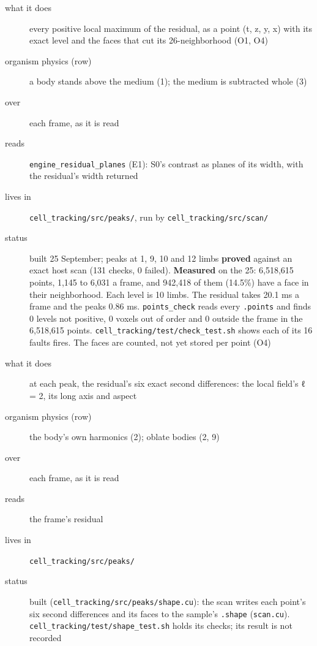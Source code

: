 \begin{description}
\item[{what it does}] every positive local maximum of the residual, as a point (t, z, y, x) with its exact level and the faces that cut its 26-neighborhood (O1, O4)
\item[{organism physics (row)}] a body stands above the medium (1); the medium is subtracted whole (3)
\item[{over}] each frame, as it is read
\item[{reads}] \texttt{engine\_\allowbreak{}residual\_\allowbreak{}planes} (E1): S0's contrast as planes of its width, with the residual's width returned
\item[{lives in}] \texttt{cell\_\allowbreak{}tracking/\allowbreak{}src/\allowbreak{}peaks/\allowbreak{}}, run by \texttt{cell\_\allowbreak{}tracking/\allowbreak{}src/\allowbreak{}scan/\allowbreak{}}
\item[{status}] built 25 September; peaks at 1, 9, 10 and 12 limbs \textbf{proved} against an exact host scan (131 checks, 0 failed). \textbf{Measured} on the 25: 6,518,615 points, 1,145 to 6,031 a frame, and 942,418 of them (14.5\%) have a face in their neighborhood. Each level is 10 limbs. The residual takes 20.1 ms a frame and the peaks 0.86 ms. \texttt{points\_\allowbreak{}check} reads every \texttt{.\allowbreak{}points} and finds 0 levels not positive, 0 voxels out of order and 0 outside the frame in the 6,518,615 points. \texttt{cell\_\allowbreak{}tracking/\allowbreak{}test/\allowbreak{}check\_\allowbreak{}test.\allowbreak{}sh} shows each of its 16 faults fires. The faces are counted, not yet stored per point (O4)
\end{description}

\begin{description}
\item[{what it does}] at each peak, the residual's six exact second differences: the local field's ℓ = 2, its long axis and aspect
\item[{organism physics (row)}] the body's own harmonics (2); oblate bodies (2, 9)
\item[{over}] each frame, as it is read
\item[{reads}] the frame's residual
\item[{lives in}] \texttt{cell\_\allowbreak{}tracking/\allowbreak{}src/\allowbreak{}peaks/\allowbreak{}}
\item[{status}] built (\texttt{cell\_\allowbreak{}tracking/\allowbreak{}src/\allowbreak{}peaks/\allowbreak{}shape.\allowbreak{}cu}): the scan writes each point's six second differences and its faces to the sample's \texttt{.\allowbreak{}shape} (\texttt{scan.\allowbreak{}cu}). \texttt{cell\_\allowbreak{}tracking/\allowbreak{}test/\allowbreak{}shape\_\allowbreak{}test.\allowbreak{}sh} holds its checks; its result is not recorded
\end{description}

